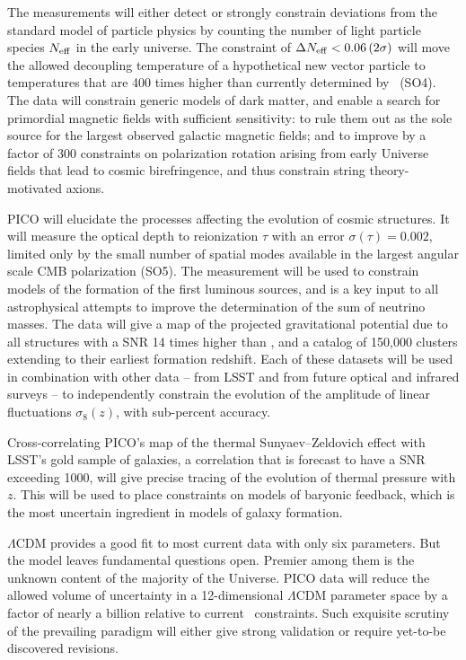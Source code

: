 \documentclass[PICOAPC.tex]{subfiles}
\begin{document}
The measurements will either detect or strongly constrain deviations from the standard model of particle physics by counting the number of light particle species $N_{\rm eff}$ in the early universe.  The constraint of $\Delta N_{\rm eff} < 0.06 \, (2\sigma)$ will move the allowed decoupling temperature of a hypothetical new vector particle to temperatures that are 400 times higher than currently determined by \planck\ (SO4). The data will constrain generic models of dark matter, and enable a search for primordial magnetic fields with sufficient sensitivity: to rule them out as the sole source for the largest observed galactic magnetic fields; and to improve by a factor of 300 constraints on polarization rotation arising from early Universe fields that lead to cosmic birefringence, and thus constrain string theory-motivated axions. 

PICO will elucidate the processes affecting the evolution of cosmic structures. It will measure the optical depth to reionization $\tau$ with an error $\sigma(\tau) = 0.002$, limited only by the small number of spatial modes available in the largest angular scale CMB polarization (SO5). The measurement will be used to constrain models of the formation of the first luminous sources, and is a key input to all astrophysical attempts to improve the determination of the sum of neutrino masses. The data will give a map of the projected gravitational potential due to all structures with a \ac{SNR} 14 times higher than \planck , and a catalog of 150,000 clusters extending to their earliest formation redshift. Each of these datasets will be used in combination with other data -- from LSST and from future optical and infrared surveys -- to independently constrain the evolution of the amplitude of linear fluctuations $\sigma_{8}(z)$, with sub-percent accuracy.  

Cross-correlating PICO's map of the thermal Sunyaev--Zeldovich effect with LSST's gold sample of galaxies, a correlation that is forecast to have a \ac{SNR} exceeding 1000, will give precise tracing of the evolution of thermal pressure with $z$. This will be used to place constraints on models of baryonic feedback, which is the most uncertain ingredient in models of galaxy formation. 


$\Lambda$CDM provides a good fit to most current data with only six parameters. But the model leaves fundamental questions open. Premier among them is the unknown content of the majority of the Universe. PICO data will reduce the allowed volume of uncertainty in a 12-dimensional $ \Lambda$CDM parameter space by a factor of nearly a billion relative to current \planck\ constraints. Such exquisite scrutiny of the prevailing paradigm will either give strong validation or require yet-to-be discovered revisions.
\end{document}

